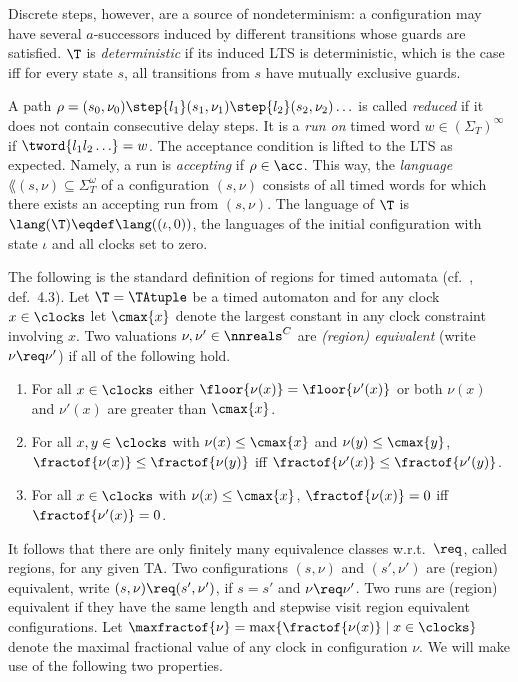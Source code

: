 Discrete steps, however, are a source of nondeterminism: 
a configuration may have several $a$-successors
induced by different transitions whose guards are satisfied.
$\T$ is \emph{deterministic} if its induced LTS is deterministic, which is the case iff for every state $s$, all transitions from $s$ have mutually exclusive guards.

A path
$\rho=
(s_0,\nu_0)
\step{l_1}
(s_1,\nu_1)
\step{l_2}
(s_2,\nu_2)
\ldots
$
is called \emph{reduced} if it does not contain consecutive delay steps.
It is a \emph{run on} timed word
$w
\in (\Sigma_T)^\infty$
if
$\tword{l_1l_2\ldots}=w$.
The acceptance condition is lifted to the LTS as expected. Namely,
a run is \emph{accepting}
if $\rho\in\acc$.
This way,
the \emph{language} $\lang(s,\nu)\subseteq \Sigma_T^\omega$ of a configuration $(s,\nu)$
consists of all timed words for which there exists an accepting run from $(s,\nu)$.
The language of $\T$ is $\lang(\T)\eqdef\lang((\iota,0))$, the languages of the initial configuration with state $\iota$ and all clocks set to zero.


\medskip
{}
The following is the standard definition of regions for timed automata (cf.~\cite{AD1994}, def.~4.3).
Let $\T=\TAtuple$ be a timed automaton and
for any clock $x\in\clocks$ let $\cmax{x}$ denote the largest constant in any clock constraint involving $x$.
Two valuations $\nu,\nu'\in \nnreals^C$ are \emph{(region) equivalent} (write $\nu\req\nu'$) if all of the following hold.
\begin{enumerate}
\item For all $x\in\clocks$ either $ \floor{\nu(x)}=\floor{\nu'(x)} $
    or both $\nu(x)$ and $\nu'(x)$ are greater than $\cmax{x}$.
\item For all $x,y\in\clocks$ with $\nu(x)\le \cmax{x}$ and $\nu(y)\le \cmax{y}$,
    $\fractof{\nu(x)}\le \fractof{\nu(y)}$
    iff
    $\fractof{\nu'(x)}\le \fractof{\nu'(y)}$.
\item For all $x\in\clocks$ with $\nu(x)\le \cmax{x}$, $\fractof{\nu(x)}=0$ iff $\fractof{\nu'(x)}=0$.
\end{enumerate}
It follows that there are only finitely many equivalence classes w.r.t.~$\req$, called regions, for any given TA. Two configurations $(s,\nu)$ and $(s',\nu')$ are (region) equivalent,
write $(s,\nu)\req(s',\nu')$, if $s=s'$ and $\nu\req\nu'$.
Two runs are (region) equivalent if they have the same length and stepwise visit region equivalent configurations.
Let $\maxfractof{\nu} = \max\{\fractof{\nu(x)} \mid x\in\clocks\}$ denote the maximal fractional value of any clock in configuration $\nu$.
We will make use of the following two properties.


